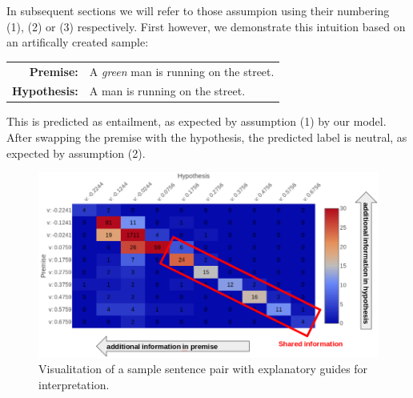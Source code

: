 In subsequent sections we will refer to those assumpion using their numbering (1), (2) or (3) respectively. First however, we demonstrate this intuition based on an artifically created sample:
\begin{center}
\begin{tabular}{rl}
\textbf{Premise:} & A \textit{green} man is running on the street.
\\
\textbf{Hypothesis:} & A man is running on the street.
\end{tabular}
\end{center}
This is predicted as entailment, as expected by assumption (1) by our model. After swapping the premise with the hypothesis, the predicted label is neutral, as expected by assumption (2).
\begin{figure}[tph!]
\centering
	\includegraphics[totalheight=6cm]{fig/sample_coverage_prob.png}
	\caption{Visualitation of a sample sentence pair with explanatory guides for interpretation.}
	\label{fig:sample_coverage_prob}
\end{figure}
